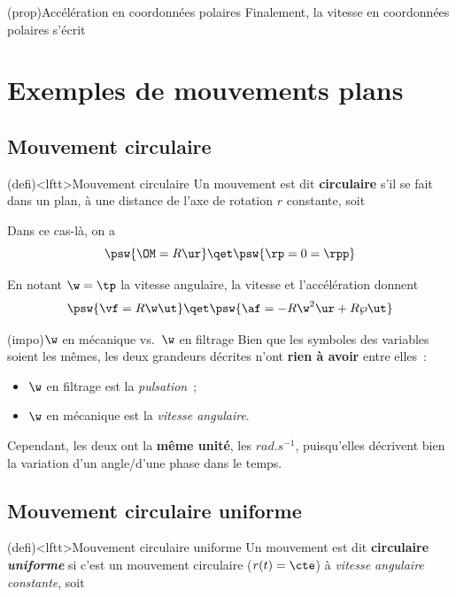 \documentclass[../../main/main.tex]{subfiles}
\begin{document}
\begin{tcb*}(prop){Accélération en coordonnées polaires}
	Finalement, la vitesse en coordonnées polaires s'écrit
  \psw{
      \[
      \boxed{
        \af = \left( \rpp -r\tp^2 \right)\ur + \left( 2\rp\tp+r\tpp \right)\ut
      }
    \]
  }
  \vspace{-15pt}
\end{tcb*}

\section{Exemples de mouvements plans}
\subsection{Mouvement circulaire}

\begin{tcb*}(defi)<lftt>{Mouvement circulaire}
	Un mouvement est dit \textbf{circulaire} s'il se fait dans un plan, à une
	distance de l'axe de rotation $r$ constante, soit
  \psw{
      \[
      r(t) = R
    \]
  }
  \vspace{-15pt}
\end{tcb*}

Dans ce cas-là, on a
\[
	\psw{\OM = R\ur}
	\qet
	\psw{\rp = 0 = \rpp}
\]

En notant $\w = \tp$ la vitesse angulaire, la vitesse et l'accélération donnent
\[
	\psw{\vf = R\w\ut}
	\qet
	\psw{\af = -R\w^2\ur + R\wp\ut}
\]

\begin{tcb*}(impo){$\w$ en mécanique vs.\ $\w$ en filtrage}
  Bien que les symboles des variables soient les mêmes, les deux grandeurs
  décrites n'ont \textbf{rien à avoir} entre elles~:
  \begin{itemize}
    \item $\w$ en filtrage est la \textit{pulsation}~;
    \item $\w$ en mécanique est la \textit{vitesse angulaire}.
  \end{itemize}
  Cependant, les deux ont la \textbf{même unité}, les $\si{rad.s^{-1}}$,
  puisqu'elles décrivent bien la variation d'un angle/d'une phase dans le temps.
\end{tcb*}

\subsection{Mouvement circulaire uniforme}
\begin{tcb*}(defi)<lftt>{Mouvement circulaire uniforme}
	Un mouvement est dit \textbf{circulaire \textit{uniforme}} si c'est un
	mouvement circulaire ($r(t) = \cte$) à \textit{vitesse angulaire
		constante}, soit
    \psw{
        \[
        \left\{
        \begin{array}{rcl}
          r(t)   & = & R  \\
          \tp(t) & = & \w
        \end{array}
        \right.
      \]
    }
\end{tcb*}
\end{document}
